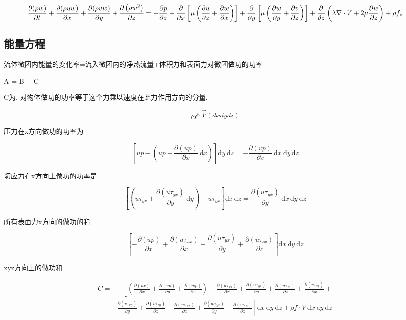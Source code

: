 $$
	\frac{\partial(\rho w)}{\partial t}+\frac{\partial(\rho u w)}{\partial x}+\frac{\partial(\rho v w)}{\partial y}+\frac{\partial\left(\rho w^{2}\right)}{\partial z}=-\frac{\partial p}{\partial z}+\frac{\partial}{\partial x}\left[\mu\left(\frac{\partial u}{\partial z}+\frac{\partial w}{\partial x}\right)\right]+ \\
	\frac{\partial}{\partial y}\left[\mu\left(\frac{\partial w}{\partial y}+\frac{\partial v}{\partial z}\right)\right]+\frac{\partial}{\partial z}\left(\lambda \nabla \cdot V+2 \mu \frac{\partial w}{\partial z}\right)+\rho f_{z}
$$
\subsection{能量方程}

流体微团内能量的变化率=流入微团内的净热流量+体积力和表面力对微团做功的功率

A = B + C

C为, 对物体做功的功率等于这个力乘以速度在此力作用方向的分量.

$$
	\rho \mathcal{f} \cdot \vec{V} (dxdydz)
$$

压力在x方向做功的功率为

$$
	\left[u p-\left(u p+\frac{\partial(u p)}{\partial x} \mathrm{~d} x\right)\right] \mathrm{d} y \mathrm{~d} z=-\frac{\partial(u p)}{\partial x} \mathrm{~d} x \mathrm{~d} y \mathrm{~d} z
$$


切应力在x方向上做功的功率是

$$
	\left[\left(u \tau_{y x}+\frac{\partial\left(u \tau_{y x}\right)}{\partial y} \mathrm{~d} y\right)-u \tau_{y x}\right] \mathrm{d} x \mathrm{~d} z=\frac{\partial\left(u \tau_{y x}\right)}{\partial y} \mathrm{~d} x \mathrm{~d} y \mathrm{~d} z
$$

所有表面力x方向的做功的和

$$
	\left[-\frac{\partial(u p)}{\partial x}+\frac{\partial\left(u \tau_{x x}\right)}{\partial x}+\frac{\partial\left(u \tau_{y x}\right)}{\partial y}+\frac{\partial\left(u \tau_{z x}\right)}{\partial z}\right] \mathrm{d} x \mathrm{~d} y \mathrm{~d} z
$$

xyz方向上的做功和

$$
	\begin{aligned}
		C= & -\left[\left(\frac{\partial(u p)}{\partial x}+\frac{\partial(v p)}{\partial y}+\frac{\partial(w p)}{\partial z}\right)+\frac{\partial\left(u \tau_{x x}\right)}{\partial x}+\frac{\partial\left(u \tau_{y x}\right)}{\partial y}+\frac{\partial\left(u \tau_{z x}\right)}{\partial z}+\frac{\partial\left(v \tau_{x y}\right)}{\partial x}+\right.                                    \\
		   & \left.\frac{\partial\left(v \tau_{r y}\right)}{\partial y}+\frac{\partial\left(v \tau_{z y}\right)}{\partial z}+\frac{\partial\left(w \tau_{z z}\right)}{\partial x}+\frac{\partial\left(w \tau_{y z}\right)}{\partial y}+\frac{\partial\left(w \tau_{z}\right)}{\partial z}\right] \mathrm{d} x \mathrm{~d} y \mathrm{~d} z+\rho f \cdot V \mathrm{~d} x \mathrm{~d} y \mathrm{~d} z
	\end{aligned}
$$

